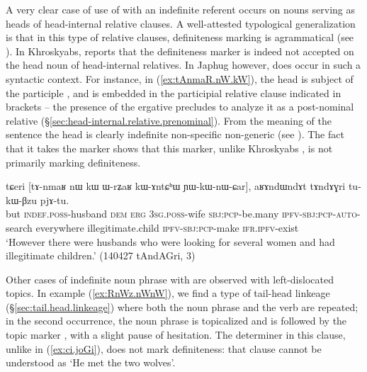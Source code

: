 A very clear case of use of  with an indefinite referent occurs on nouns serving as heads of head-internal relative clauses. A well-attested typological generalization is that in this type of relative clauses, definiteness marking is agrammatical (see \citealt{basilico96internally}). In Khroskyabs, \citet[636]{lai17khroskyabs} reports that the definiteness marker  is indeed not accepted on the head noun of head-internal relatives. In Japhug however,  does occur in such a syntactic context. For instance, in (\ref{ex:tAnmaR.nW.kW}), the head  is subject of the participle , and is embedded in the participial relative clause indicated in brackets -- the presence of the ergative  precludes to analyze it as a post-nominal relative (§\ref{sec:head-internal.relative.prenominal}). From the meaning of the sentence the head  is clearly indefinite non-specific non-generic  (see \citealt[286--291]{lehmann84relativsatz}). The fact that it takes the marker  shows that this marker, unlike Khroskyabs , is not primarily marking definiteness.

\begin{exe}
\ex \label{ex:tAnmaR.nW.kW}
 \gll tɕeri [tɤ-nmaʁ nɯ kɯ ɯ-rʑaʁ kɯ-ɤntɕʰɯ ɲɯ-kɯ-nɯ-ɕar], aʁɤndɯndɤt tɤndɤɣri tu-kɯ-βzu pjɤ-tu.  \\
but  \textsc{indef}.\textsc{poss}-husband \textsc{dem} \textsc{erg} \textsc{3sg}.\textsc{poss}-wife  \textsc{sbj}:\textsc{pcp}-be.many \textsc{ipfv}-\textsc{sbj}:\textsc{pcp}-\textsc{auto}-search everywhere  illegitimate.child  \textsc{ipfv}-\textsc{sbj}:\textsc{pcp}-make \textsc{ifr}.\textsc{ipfv}-exist \\
\glt `However there were husbands who were looking for several women and had illegitimate children.' (140427 tAndAGri, 3)
\end{exe}

Other cases of indefinite noun phrase with  are observed with left-dislocated topics. In example (\ref{ex:RnWz.nWnW}), we find a type of tail-head linkeage  (§\ref{sec:tail.head.linkeage}) where both the noun phrase  and the verb  are repeated; in the second occurrence, the noun phrase is topicalized and is followed by the topic marker , with a slight pause of hesitation. The determiner  in this clause, unlike  in (\ref{ex:ci.joGi}), does not mark definiteness: that clause cannot be understood as `He met the two wolves'.

